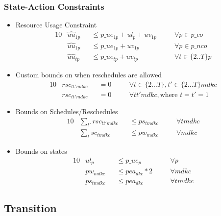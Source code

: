 \subsubsection{State-Action Constraints}
\label{state-action constraints}
\begin{itemize}
	
	\item Resource Usage Constraint
	\begin{alignat}{10}
		& \hat{uu}_{1p} 
			&& \le p\_ue_{1p} + ul_{p} + uv_{1p} \quad 
			&& \forall p \in p\_co \\
		& \hat{uu}_{1p} 
			&& \le p\_ue_{1p} + uv_{1p} \quad 
			&& \forall p \in p\_nco \\
		& \hat{uu}_{tp} 
			&& \le p\_ue_{tp} + uv_{tp} \quad
			&& \forall t \in \{ 2..T \}p 
	\end{alignat}
	
	\item Custom bounds on when reschedules are allowed
	\begin{alignat}{10}
		& rsc_{tt'mdkc} && = 0 \quad && \forall t \in \{ 2...T \}, t' \in \{2...T\} mdkc \\
		& rsc_{tt'mdkc} && = 0 \quad && \forall tt'mdkc, \text{where } t=t'=1 
	\end{alignat}  
	
	\item Bounds on Schedules/Reschedules
	\begin{alignat}{10}
		& \sum_{t'} rsc_{tt'mdkc} 	&& \le ps_{tmdkc} \quad  && \forall tmdkc  \\
		& \sum_{t} sc_{tmdkc} 		&& \le pw_{mdkc} \quad 	&& \forall mdkc 
	\end{alignat}  
	
	\item Bounds on states
	\begin{alignat}{10}
		& ul_{p} 	&& \le p\_ue_{p} \quad 			&& \forall p \\
		& pw_{mdkc} 	&& \le pea_{dkc} * 2 \quad 			&& \forall mdkc \\
		& ps_{tmdkc} && \le pea_{dkc} \quad 			&& \forall tmdkc
	\end{alignat}
\end{itemize}

\subsection{Transition}

